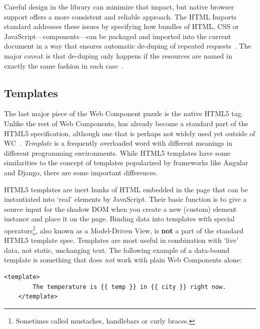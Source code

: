 Careful design in the library can minimize that impact, but native browser support offers a more consistent and reliable approach.
The HTML Imports standard addresses these issues by specifying how bundles of HTML, 
CSS or JavaScript---components---can be packaged and imported into the current document in a way that ensures automatic de-duping of repeated requests~\cite{w3ccontributors2015-a}.
The major caveat is that de-duping only happens if the resources are named in exactly the same fashion in each case~\cite{bidelman2013}.

\subsection{Templates}
The last major piece of the Web Component puzzle is the native HTML5  tag. 
Unlike the rest of Web Components,  has already become a standard part of the HTML5 specification, 
although one that is perhaps not widely used yet outside of WC~\cite{w3ccontributors2015-c}.
\textit{Template} is a frequently overloaded word with different meanings in different programming environments.
While HTML5 templates have some similarities to the concept of templates popularized by frameworks like Angular and Django, there are some important differences.

HTML5 templates are inert hunks of HTML embedded in the page that can be instantiated into `real' elements by JavaScript.
Their basic function is to give a source input for the shadow DOM when you create a new (custom) element instance and place it on the page.
Binding data into templates with special operators\footnote{
Sometimes called mustaches, handlebars or curly braces. },
also known as a Model-Driven View,
is \textbf{not} a part of the standard HTML5 template spec.
Templates are most useful in combination with `live' data, not static, unchanging text.
The following example of a data-bound template is something that does \textit{not} work with plain Web Components alone:

\begin{lstlisting}[language=HTML5,caption={An example of a data-bound template.},label=l:dbtemplate]
	<template> 
		The temperature is {{ temp }} in {{ city }} right now.
	</template>
\end{lstlisting}

